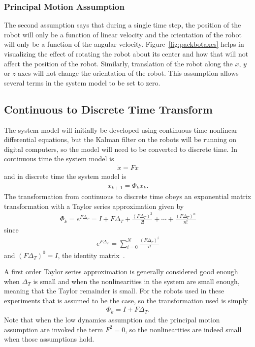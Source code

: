 \subsubsection{Principal Motion Assumption}%
\label{sec:kfPrincipalMotionAssumption}
The second assumption says that during a single time step, the position of the robot will only be a function of linear velocity and the orientation of the robot will only be a function of the angular velocity.
Figure~\ref{fig:packbotaxes} helps in visualizing the effect of rotating the robot about its center and how that will not affect the position of the robot.
Similarly, translation of the robot along the $x$, $y$ or $z$ axes will not change the orientation of the robot.
This assumption allows several terms in the system model to be set to zero.

\subsection{Continuous to Discrete Time Transform}%
\label{sec:kfContToDiscTransform}
The system model will initially be developed using continuous-time nonlinear differential equations, but the Kalman filter on the robots will be running on digital computers, so the model will need to be converted to discrete time.
In continuous time the system model is 
\begin{align*}
\dot{x} = Fx
\end{align*}
and in discrete time the system model is
\begin{align*}
x_{k+1} = \Phi_k x_k.
\end{align*}
The transformation from continuous to discrete time obeys an exponential matrix transformation with a Taylor series approximation given by~\cite{Gelb74}
\begin{align*}
\Phi_k = e^{F\Delta_T} = I + F\Delta_T + \frac{{(F\Delta_T)}^2}{2!} + \cdots + \frac{{(F\Delta_T)}^n}{n!}
\end{align*}
since
\begin{align*}
e^{F\Delta_T} = \sum_{i=0}^N \frac{{(F\Delta_T)}^i}{i!}
\end{align*}
and ${(F\Delta_T)}^0=I$, the identity matrix~\cite{Phadke99}.

A first order Taylor series approximation is generally considered good enough when $\Delta_T$ is small and when the nonlinearities in the system are small enough, meaning that the Taylor remainder is small.
For the robots used in these experiments that is assumed to be the case, so the transformation used is simply
\begin{align}
\label{eq:kfContToDiscTransform}
\Phi_k = I + F\Delta_T.
\end{align}
Note that when the low dynamics assumption and the principal motion assumption are invoked the term $F^2=0$, so the nonlinearities are indeed small when those assumptions hold.


